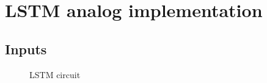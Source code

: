 \section{\ac{LSTM} analog implementation}\label{sec:lstmCircuit}

\subsection{Inputs}%

\begin{figure}[H]
\centering

\caption{\ac{LSTM} circuit}
\label{circt:lstm}
\end{figure}
